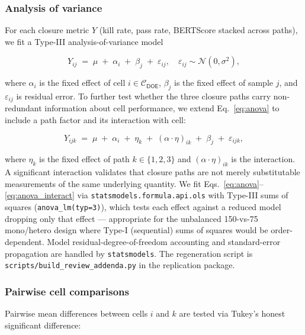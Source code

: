 \subsubsection{Analysis of variance}

For each closure metric $Y$ (kill rate, pass rate, BERTScore stacked across paths), we fit a Type-III analysis-of-variance model

\begin{equation}
  Y_{ij} \;=\; \mu \;+\; \alpha_i \;+\; \beta_j \;+\; \varepsilon_{ij},
  \quad \varepsilon_{ij} \sim \mathcal{N}(0, \sigma^2),
  \label{eq:anova}
\end{equation}

where $\alpha_i$ is the fixed effect of cell $i \in \mathcal{C}_{\textsf{DOE}}$, $\beta_j$ is the fixed effect of sample $j$, and $\varepsilon_{ij}$ is residual error. To further test whether the three closure paths carry non-redundant information about cell performance, we extend Eq.~\ref{eq:anova} to include a path factor and its interaction with cell:

\begin{equation}
  Y_{ijk} \;=\; \mu \;+\; \alpha_i \;+\; \eta_k \;+\; (\alpha \cdot \eta)_{ik} \;+\; \beta_j \;+\; \varepsilon_{ijk},
  \label{eq:anova_interact}
\end{equation}

where $\eta_k$ is the fixed effect of path $k \in \{1, 2, 3\}$ and $(\alpha \cdot \eta)_{ik}$ is the interaction. A significant interaction validates that closure paths are not merely substitutable measurements of the same underlying quantity. We fit Eqs.~\ref{eq:anova}--\ref{eq:anova_interact} via \texttt{statsmodels.formula.api.ols} with Type-III sums of squares (\texttt{anova\_lm(typ=3)}), which tests each effect against a reduced model dropping only that effect --- appropriate for the unbalanced 150-vs-75 mono/hetero design where Type-I (sequential) sums of squares would be order-dependent. Model residual-degree-of-freedom accounting and standard-error propagation are handled by \texttt{statsmodels}. The regeneration script is \texttt{scripts/build\_review\_addenda.py} in the replication package.

\subsubsection{Pairwise cell comparisons}

Pairwise mean differences between cells $i$ and $k$ are tested via Tukey's honest significant difference:

